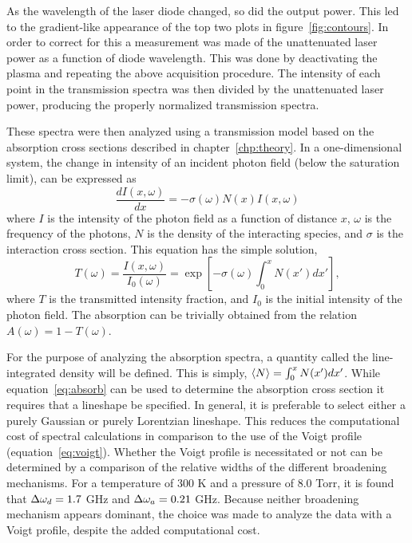 As the wavelength of the laser diode changed, so did the output power. This led
to the gradient-like appearance of the top two plots in
figure~\ref{fig:contours}. In order to correct for this a measurement was made
of the unattenuated laser power as a function of diode wavelength. This was done by
deactivating the plasma and repeating the above acquisition procedure. The
intensity of each point in the transmission spectra was then divided by the
unattenuated laser power, producing the properly normalized transmission
spectra.

These spectra were then analyzed using a transmission model based on the
absorption cross sections described in chapter~\ref{chp:theory}. In a
one-dimensional system, the change in intensity of an incident photon field
(below the saturation limit), can be expressed as
\begin{equation}
  \frac{dI(x, \omega)}{dx} = -\sigma(\omega) N(x) I(x, \omega)
\end{equation}
where $I$ is the intensity of the photon field as a function of distance $x$,
$\omega$ is the frequency of the photons, $N$ is the density of the interacting
species, and $\sigma$ is the interaction cross section. This equation has the
simple solution,
\begin{equation}
  T(\omega) = \frac{I(x, \omega)}{I_0(\omega)}
            = \exp\left[-\sigma(\omega) \int_0^x N(x') dx'\right],
  \label{eq:transmitted}
\end{equation}
where $T$ is the transmitted intensity fraction, and $I_0$ is the initial
intensity of the photon field. The absorption can be trivially obtained from the
relation $A(\omega) = 1 - T(\omega)$.

For the purpose of analyzing the absorption spectra, a quantity called the
line-integrated density will be defined. This is simply, $\langle N \rangle = \int_0^x
N(x')dx'$. While equation~\ref{eq:absorb} can be used to determine the
absorption cross section it requires that a lineshape be specified. In general,
it is preferable to select either a purely Gaussian or purely Lorentzian
lineshape. This reduces the computational cost of spectral calculations in
comparison to the use of the Voigt profile (equation~\ref{eq:voigt}). Whether
the Voigt profile is necessitated or not can be determined by a comparison of
the relative widths of the different broadening mechanisms. For a temperature of
300 K and a pressure of 8.0 Torr, it is found that $\Delta \omega_d = 1.7$ GHz and $\Delta \omega_a =
0.21$ GHz. Because neither broadening mechanism appears dominant, the choice was
made to analyze the data with a Voigt profile, despite the added computational
cost.

